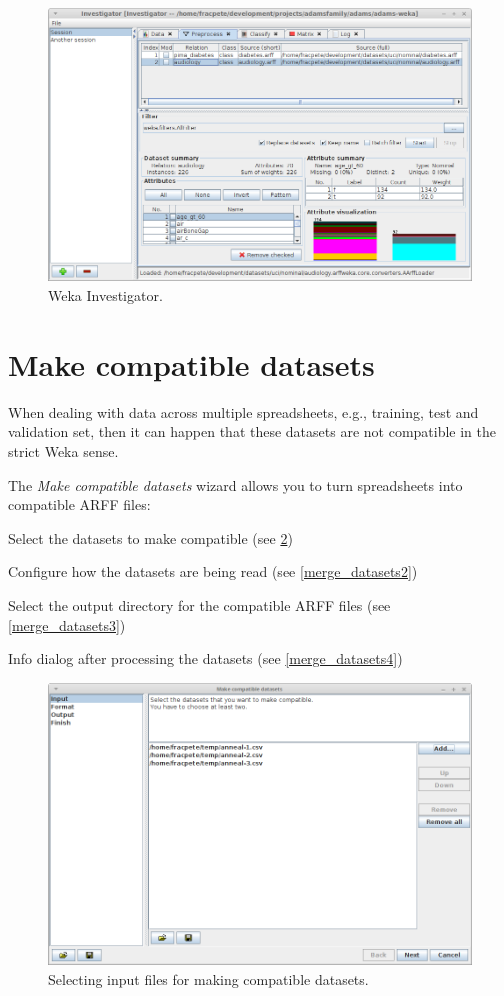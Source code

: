 \begin{figure}[htb]
  \centering
  \includegraphics[width=12.0cm]{images/wekainvestigator.png}
  \caption{Weka Investigator.}
  \label{wekainvestigator}
\end{figure}

\clearpage
\section{Make compatible datasets}
When dealing with data across multiple spreadsheets, e.g., training, test
and validation set, then it can happen that these datasets are not compatible
in the strict Weka sense.

The \textit{Make compatible datasets} wizard allows you to turn spreadsheets
into compatible ARFF files:
\begin{tight_itemize}
  \item Select the datasets to make compatible (see \ref{makecompatible1})
  \item Configure how the datasets are being read (see \ref{merge_datasets2})
  \item Select the output directory for the compatible ARFF files (see \ref{merge_datasets3})
  \item Info dialog after processing the datasets (see \ref{merge_datasets4})
\end{tight_itemize}

\begin{figure}[htb]
  \centering
  \includegraphics[width=12.0cm]{images/makecompatible1.png}
  \caption{Selecting input files for making compatible datasets.}
  \label{makecompatible1}
\end{figure}

